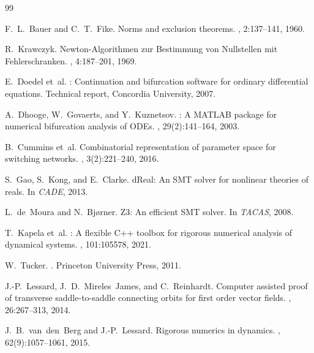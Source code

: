 \documentclass[11pt]{article}
\begin{document}

\begin{thebibliography}{99}

F.~L.~Bauer and C.~T.~Fike.
\newblock Norms and exclusion theorems.
, 2:137--141, 1960.

R.~Krawczyk.
\newblock Newton-{A}lgorithmen zur {B}estimmung von {N}ullstellen mit {F}ehlerschranken.
, 4:187--201, 1969.

E.~Doedel et~al.
: Continuation and bifurcation software for ordinary differential equations.
\newblock Technical report, Concordia University, 2007.

A.~Dhooge, W.~Govaerts, and Y.~Kuznetsov.
: A {MATLAB} package for numerical bifurcation analysis of {ODE}s.
, 29(2):141--164, 2003.

B.~Cummins et~al.
\newblock Combinatorial representation of parameter space for switching networks.
, 3(2):221--240, 2016.

S.~Gao, S.~Kong, and E.~Clarke.
\newblock d{R}eal: An {SMT} solver for nonlinear theories of reals.
\newblock In {\em CADE}, 2013.

L.~de~Moura and N.~Bj{\o}rner.
\newblock Z3: An efficient {SMT} solver.
\newblock In {\em TACAS}, 2008.

T.~Kapela et~al.
: A flexible {C++} toolbox for rigorous numerical analysis of dynamical systems.
, 101:105578, 2021.

W.~Tucker.
.
\newblock Princeton University Press, 2011.

J.-P.~Lessard, J.~D.~Mireles~James, and C.~Reinhardt.
\newblock Computer assisted proof of transverse saddle-to-saddle connecting orbits for first order vector fields.
, 26:267--313, 2014.

J.~B.~van~den~Berg and J.-P.~Lessard.
\newblock Rigorous numerics in dynamics.
, 62(9):1057--1061, 2015.


\end{thebibliography}
\end{document}
